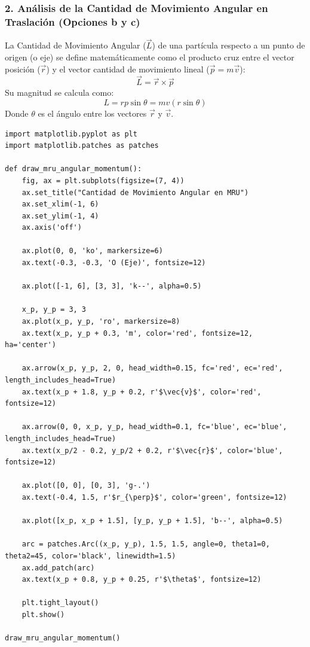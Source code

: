 \documentclass[12pt, a4paper]{article}
\begin{document}
\subsubsection*{2. Análisis de la Cantidad de Movimiento Angular en Traslación (Opciones b y c)}
La Cantidad de Movimiento Angular ($\vec{L}$) de una partícula respecto a un punto de origen (o eje) se define matemáticamente como el producto cruz entre el vector posición ($\vec{r}$) y el vector cantidad de movimiento lineal ($\vec{p} = m\vec{v}$):
$$\vec{L} = \vec{r} \times \vec{p}$$
Su magnitud se calcula como:
$$L = r p \sin\theta = m v (r \sin\theta)$$
Donde $\theta$ es el ángulo entre los vectores $\vec{r}$ y $\vec{v}$.

\begin{lstlisting}
import matplotlib.pyplot as plt
import matplotlib.patches as patches

def draw_mru_angular_momentum():
    fig, ax = plt.subplots(figsize=(7, 4))
    ax.set_title("Cantidad de Movimiento Angular en MRU")
    ax.set_xlim(-1, 6)
    ax.set_ylim(-1, 4)
    ax.axis('off')

    ax.plot(0, 0, 'ko', markersize=6)
    ax.text(-0.3, -0.3, 'O (Eje)', fontsize=12)

    ax.plot([-1, 6], [3, 3], 'k--', alpha=0.5)
    
    x_p, y_p = 3, 3
    ax.plot(x_p, y_p, 'ro', markersize=8)
    ax.text(x_p, y_p + 0.3, 'm', color='red', fontsize=12, ha='center')

    ax.arrow(x_p, y_p, 2, 0, head_width=0.15, fc='red', ec='red', length_includes_head=True)
    ax.text(x_p + 1.8, y_p + 0.2, r'$\vec{v}$', color='red', fontsize=12)

    ax.arrow(0, 0, x_p, y_p, head_width=0.1, fc='blue', ec='blue', length_includes_head=True)
    ax.text(x_p/2 - 0.2, y_p/2 + 0.2, r'$\vec{r}$', color='blue', fontsize=12)

    ax.plot([0, 0], [0, 3], 'g-.')
    ax.text(-0.4, 1.5, r'$r_{\perp}$', color='green', fontsize=12)
    
    ax.plot([x_p, x_p + 1.5], [y_p, y_p + 1.5], 'b--', alpha=0.5)
    
    arc = patches.Arc((x_p, y_p), 1.5, 1.5, angle=0, theta1=0, theta2=45, color='black', linewidth=1.5)
    ax.add_patch(arc)
    ax.text(x_p + 0.8, y_p + 0.25, r'$\theta$', fontsize=12)

    plt.tight_layout()
    plt.show()

draw_mru_angular_momentum()
\end{lstlisting}
\end{document}
